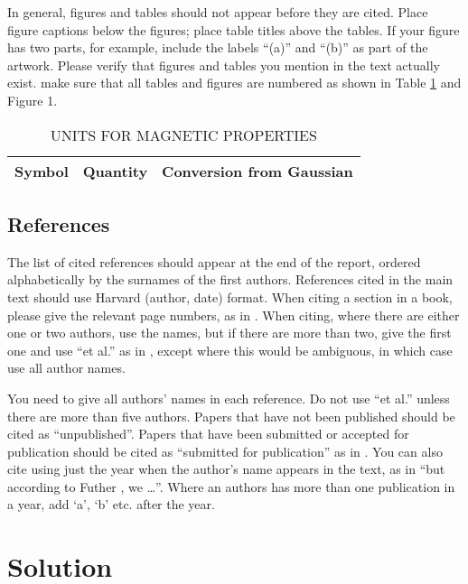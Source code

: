\documentclass[12pt,a4paper]{article}
\begin{document}
In general, figures and tables should not appear before they are cited.  Place figure captions below the figures; place table titles above the tables.  If your figure has two parts, for example, include the labels ``(a)'' and ``(b)'' as part of the artwork.  Please verify that figures and tables you mention in the text actually exist.  make sure that all tables and figures are numbered as shown in Table \ref{units} and Figure 1.

\begin{table}[htb]
	\centering
	\caption{UNITS FOR MAGNETIC PROPERTIES}
	\vspace*{6pt}
	\label{units}
	\begin{tabular}{ccc}\hline\hline
		Symbol & Quantity & Conversion from Gaussian \\ \hline
	\end{tabular}
\end{table}

\subsection{References}

The list of cited references should appear at the end of the report, ordered alphabetically by the surnames of the first authors.  References cited in the main text should use Harvard (author, date) format.  When citing a section in a book, please give the relevant page numbers, as in \cite[p293]{budgen}.  When citing, where there are either one or two authors, use the names, but if there are more than two, give the first one and use ``et al.'' as in  , except where this would be ambiguous, in which case use all author names.

You need to give all authors' names in each reference.  Do not use ``et al.'' unless there are more than five authors.  Papers that have not been published should be cited as ``unpublished''.  Papers that have been submitted or accepted for publication should be cited as ``submitted for publication'' as in .  You can also cite using just the year when the author's name appears in the text, as in ``but according to Futher \citeyear{futher}, we \dots''.  Where an authors has more than one publication in a year, add `a', `b' etc. after the year.

\section{Solution}
\end{document}
